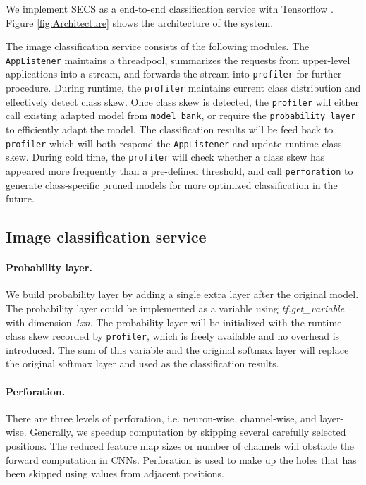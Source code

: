 \documentclass[pageno]{jpaper}
\begin{document}
We implement SECS as a end-to-end classification service with Tensorflow \cite{tensorflow2015-whitepaper}. Figure \ref{fig:Architecture} shows the architecture of the system. 

The image classification service consists of the following modules. The \texttt{AppListener} maintains a threadpool, summarizes the requests from upper-level applications into a stream, and forwards the stream into \texttt{profiler} for further procedure. During runtime, the \texttt{profiler} maintains current class distribution and effectively detect class skew. Once class skew is detected, the \texttt{profiler} will either call existing adapted model from \texttt{model bank}, or require the \texttt{probability layer} to efficiently adapt the model. The classification results will be feed back to \texttt{profiler} which will both respond the \texttt{AppListener} and update runtime class skew. During cold time, the \texttt{profiler} will check whether a class skew has appeared more frequently than a pre-defined threshold, and call \texttt{perforation} to generate class-specific pruned models for more optimized classification in the future.


\subsection{Image classification service}
\paragraph{Probability layer.}
We build probability layer by adding a single extra layer after the original model. The probability layer could be implemented as a variable using \textit{tf.get\_variable} with dimension \textit{1xn}. The probability layer will be initialized with the runtime class skew recorded by \texttt{profiler}, which is freely available and no overhead is introduced. The sum of this variable and the original softmax layer will replace the original softmax layer and used as the classification results. 

\paragraph{Perforation.}
There are three levels of perforation, i.e. neuron-wise, channel-wise, and layer-wise. Generally, we speedup computation by skipping several carefully selected positions. The reduced feature map sizes or number of channels will obstacle the forward computation in CNNs. Perforation is used to make up the holes that has been skipped using values from adjacent positions. 
\end{document}
